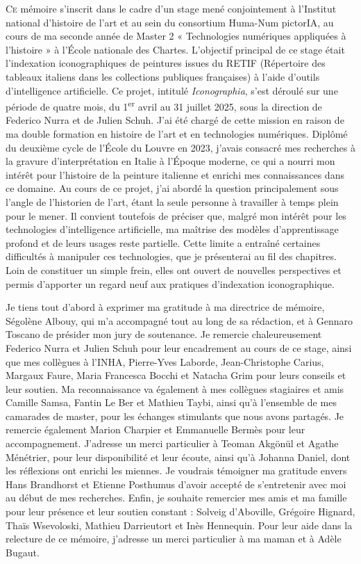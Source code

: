 \lettrine{C}e mémoire s’inscrit dans le cadre d’un stage mené conjointement à l’Institut national d'histoire de l'art et au sein du consortium Huma-Num pictorIA, au cours de ma seconde année de Master 2 « Technologies numériques appliquées à l’histoire » à l’École nationale des Chartes. L’objectif principal de ce stage était l’indexation iconographiques de peintures issues du RETIF (Répertoire des tableaux italiens dans les collections publiques françaises) à l’aide d’outils d’intelligence artificielle. Ce projet, intitulé \textit{Iconographia}, s’est déroulé sur une période de quatre mois, du 1\textsuperscript{er} avril au 31 juillet 2025, sous la direction de Federico Nurra et de Julien Schuh. J’ai été chargé de cette mission en raison de ma double formation en histoire de l’art et en technologies numériques. Diplômé du deuxième cycle de l’École du Louvre en 2023, j'avais consacré mes recherches à la gravure d’interprétation en Italie à l’Époque moderne, ce qui a nourri mon intérêt pour l’histoire de la peinture italienne et enrichi mes connaissances dans ce domaine. Au cours de ce projet, j’ai abordé la question principalement sous l’angle de l’historien de l’art, étant la seule personne à travailler à temps plein pour le mener. Il convient toutefois de préciser que, malgré mon intérêt pour les technologies d’intelligence artificielle, ma maîtrise des modèles d’apprentissage profond et de leurs usages reste partielle. Cette limite a entraîné certaines difficultés à manipuler ces technologies, que je présenterai au fil des chapitres. Loin de constituer un simple frein, elles ont ouvert de nouvelles perspectives et permis d’apporter un regard neuf aux pratiques d’indexation iconographique.

Je tiens tout d’abord à exprimer ma gratitude à ma directrice de mémoire, Ségolène Albouy, qui m’a accompagné tout au long de sa rédaction, et à Gennaro Toscano de présider mon jury de soutenance. Je remercie chaleureusement Federico Nurra et Julien Schuh pour leur encadrement au cours de ce stage, ainsi que mes collègues à l’INHA, Pierre-Yves Laborde, Jean-Christophe Carius, Margaux Faure, Maria Francesca Bocchi et Natacha Grim pour leurs conseils et leur soutien. Ma reconnaissance va également à mes collègues stagiaires et amis Camille Samsa, Fantin Le Ber et Mathieu Taybi, ainsi qu’à l’ensemble de mes camarades de master, pour les échanges stimulants que nous avons partagés. Je remercie également Marion Charpier et Emmanuelle Bermès pour leur accompagnement. J’adresse un merci particulier à Teoman Akgönül et Agathe Ménétrier, pour leur disponibilité et leur écoute, ainsi qu’à Johanna Daniel, dont les réflexions ont enrichi les miennes. Je voudrais témoigner ma gratitude envers Hans Brandhorst et Etienne Posthumus d'avoir accepté de s'entretenir avec moi au début de mes recherches. Enfin, je souhaite remercier mes amis et ma famille pour leur présence et leur soutien constant : Solveig d’Aboville, Grégoire Hignard, Thaïs Wsevoloski, Mathieu Darrieutort et Inès Hennequin. Pour leur aide dans la relecture de ce mémoire, j'adresse un merci particulier à ma maman et à Adèle Bugaut. 
